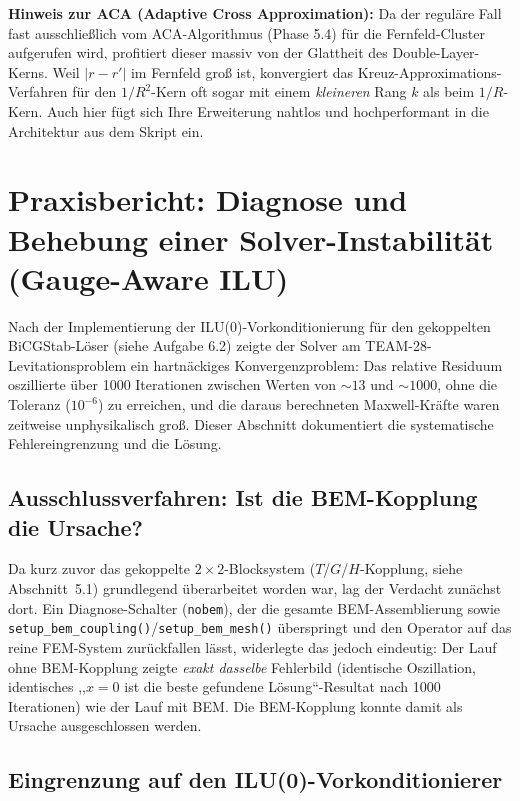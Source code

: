\documentclass[11pt,a4paper]{article}
\begin{document}
\textbf{Hinweis zur ACA (Adaptive Cross Approximation):} 
Da der reguläre Fall fast ausschließlich vom ACA-Algorithmus (Phase 5.4) für die Fernfeld-Cluster aufgerufen wird, profitiert dieser massiv von der Glattheit des Double-Layer-Kerns. Weil $|r - r'|$ im Fernfeld groß ist, konvergiert das Kreuz-Approximations-Verfahren für den $1/R^2$-Kern oft sogar mit einem \textit{kleineren} Rang $k$ als beim $1/R$-Kern. Auch hier fügt sich Ihre Erweiterung nahtlos und hochperformant in die Architektur aus dem Skript ein.

\clearpage
\section{Praxisbericht: Diagnose und Behebung einer Solver-Instabilität (Gauge-Aware ILU)}
\label{sec:ilu-praxisbericht}

Nach der Implementierung der ILU(0)-Vorkonditionierung für den gekoppelten BiCGStab-Löser (siehe Aufgabe 6.2) zeigte der Solver am TEAM-28-Levitationsproblem ein hartnäckiges Konvergenzproblem: Das relative Residuum oszillierte über 1000 Iterationen zwischen Werten von $\sim 13$ und $\sim 1000$, ohne die Toleranz ($10^{-6}$) zu erreichen, und die daraus berechneten Maxwell-Kräfte waren zeitweise unphysikalisch groß. Dieser Abschnitt dokumentiert die systematische Fehlereingrenzung und die Lösung.

\subsection{Ausschlussverfahren: Ist die BEM-Kopplung die Ursache?}

Da kurz zuvor das gekoppelte $2{\times}2$-Blocksystem ($T$/$G$/$H$-Kopplung, siehe Abschnitt~5.1) grundlegend überarbeitet worden war, lag der Verdacht zunächst dort. Ein Diagnose-Schalter (\texttt{nobem}), der die gesamte BEM-Assemblierung sowie \texttt{setup\_bem\_coupling()}/\texttt{setup\_bem\_mesh()} überspringt und den Operator auf das reine FEM-System zurückfallen lässt, widerlegte das jedoch eindeutig: Der Lauf ohne BEM-Kopplung zeigte \emph{exakt dasselbe} Fehlerbild (identische Oszillation, identisches ,,$x=0$ ist die beste gefundene Lösung``-Resultat nach 1000 Iterationen) wie der Lauf mit BEM. Die BEM-Kopplung konnte damit als Ursache ausgeschlossen werden.

\subsection{Eingrenzung auf den ILU(0)-Vorkonditionierer}
\end{document}
